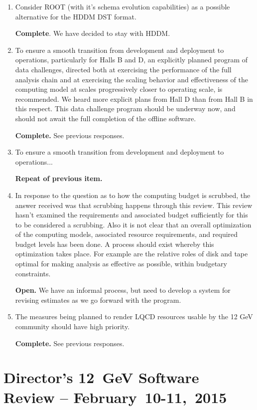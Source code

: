 \documentclass[12pt]{article}
\begin{document}
\begin{enumerate}
\item Consider ROOT (with it's schema evolution capabilities) as a
  possible alternative for the HDDM DST format.

  {\bf Complete}. We have decided to stay with HDDM.

\item To ensure a smooth transition from development and deployment to
  operations, particularly for Halls B and D, an explicitly planned
  program of data challenges, directed both at exercising the
  performance of the full analysis chain and at exercising the scaling
  behavior and effectiveness of the computing model at scales
  progressively closer to operating scale, is recommended. We heard
  more explicit plans from Hall D than from Hall B in this
  respect. This data challenge program should be underway now, and
  should not await the full completion of the offline software.

  {\bf Complete.} See previous responses.

\item To ensure a smooth transition from development and deployment to
  operations...

  {\bf Repeat of previous item.}

\item In response to the question as to how the computing budget is
  scrubbed, the answer received was that scrubbing happens through
  this review. This review hasn't examined the requirements and
  associated budget sufficiently for this to be considered a
  scrubbing. Also it is not clear that an overall optimization of the
  computing models, associated resource requirements, and required
  budget levels has been done. A process should exist whereby this
  optimization takes place. For example are the relative roles of disk
  and tape optimal for making analysis as effective as possible,
  within budgetary constraints.

  {\bf Open.} We have an informal process, but need to develop a system for revising estimates as we go forward with the program.

\item The measures being planned to render LQCD resources usable by
  the 12 GeV community should have high priority.

  {\bf Complete.} See previous responses.

\end{enumerate}

\section{Director's 12~GeV Software Review -- February~10-11,~2015}
\end{document}
